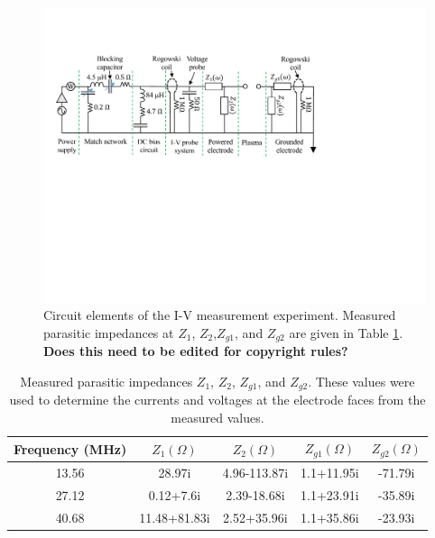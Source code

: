 \documentclass[12pt]{iopart}
\begin{document}
\begin{figure}[ht!]
\begin{center}
\includegraphics[width=.99\textwidth]{mGEC_Circuit.pdf}
	\caption{Circuit elements of the I-V measurement experiment. Measured parasitic impedances at $Z_1$, $Z_2$,$Z_{g1}$, and $Z_{g2}$ are given in Table \ref{tab:Measured_impedance}. \textbf{Does this need to be edited for copyright rules?}} 
	\label{Fig:mGEC_Circuit}
\end{center}
\end{figure}

\begin{table}[]
    \centering
    \begin{tabular}{|c|c|c|c|c|}
        \hline
        Frequency (MHz) & $Z_1 (\Omega)$ & $Z_2 (\Omega)$ & $Z_{g1} (\Omega)$ & $Z_{g2} (\Omega)$ \\
        \hline
        13.56 & 28.97i & 4.96-113.87i & 1.1+11.95i & -71.79i\\
        27.12 & 0.12+7.6i & 2.39-18.68i & 1.1+23.91i & -35.89i \\
        40.68 & 11.48+81.83i & 2.52+35.96i & 1.1+35.86i & -23.93i \\
        \hline
    \end{tabular}
    \caption{Measured parasitic impedances $Z_1$, $Z_2$, $Z_{g1}$, and $Z_{g2}$.  These values were used to determine the currents and voltages at the electrode faces from the measured values. }
    \label{tab:Measured_impedance}
\end{table}
\end{document}

